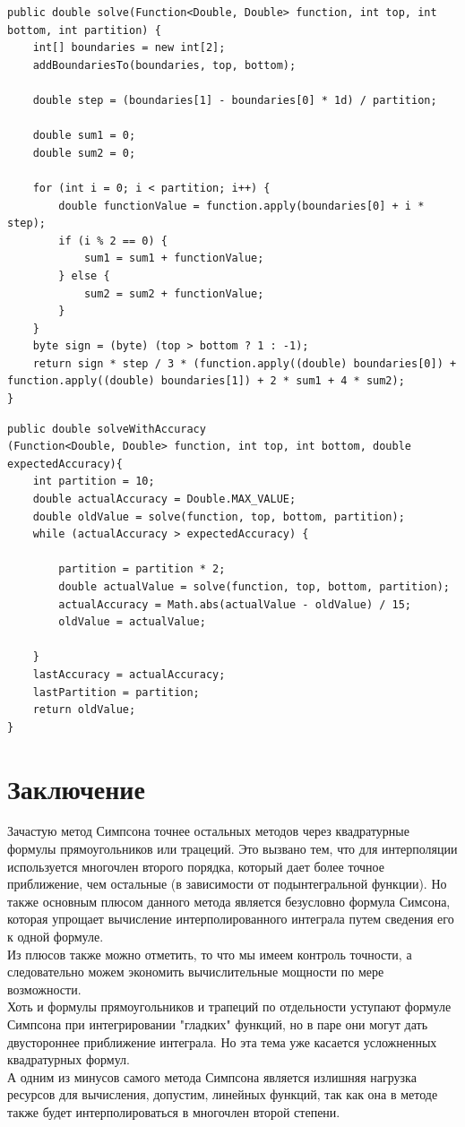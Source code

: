 \documentclass[11pt, english]{article}
\begin{document}
\begin{lstlisting}
public double solve(Function<Double, Double> function, int top, int bottom, int partition) {
    int[] boundaries = new int[2];
    addBoundariesTo(boundaries, top, bottom);

    double step = (boundaries[1] - boundaries[0] * 1d) / partition;

    double sum1 = 0;
    double sum2 = 0;

    for (int i = 0; i < partition; i++) {
        double functionValue = function.apply(boundaries[0] + i * step);
        if (i % 2 == 0) {
            sum1 = sum1 + functionValue;
        } else {
            sum2 = sum2 + functionValue;
        }
    }
    byte sign = (byte) (top > bottom ? 1 : -1);
    return sign * step / 3 * (function.apply((double) boundaries[0]) + function.apply((double) boundaries[1]) + 2 * sum1 + 4 * sum2);
}
\end{lstlisting}
\begin{lstlisting}
public double solveWithAccuracy
(Function<Double, Double> function, int top, int bottom, double expectedAccuracy){
    int partition = 10;
    double actualAccuracy = Double.MAX_VALUE;
    double oldValue = solve(function, top, bottom, partition);
    while (actualAccuracy > expectedAccuracy) {

        partition = partition * 2;
        double actualValue = solve(function, top, bottom, partition);
        actualAccuracy = Math.abs(actualValue - oldValue) / 15;
        oldValue = actualValue;

    }
    lastAccuracy = actualAccuracy;
    lastPartition = partition;
    return oldValue;
}
\end{lstlisting}

\newpage

\section{Заключение}

Зачастую метод Симпсона точнее остальных методов через квадратурные формулы прямоугольников или трацеций. Это вызвано тем, что для интерполяции используется многочлен второго порядка, который дает более точное приближение, чем остальные (в зависимости от подынтегральной функции). Но также основным плюсом данного метода является безусловно формула Симсона, которая упрощает вычисление интерполированного интеграла путем сведения его к одной формуле. \\

Из плюсов также можно отметить, то что мы имеем контроль точности, а следовательно можем экономить вычислительные мощности по мере возможности. \\

Хоть и формулы прямоугольников и трапеций по отдельности уступают формуле Симпсона при интегрировании "гладких" функций, но в паре они могут дать двустороннее приближение интеграла. Но эта тема уже касается усложненных квадратурных формул. \\

А одним из минусов самого метода Симпсона является излишняя нагрузка ресурсов для вычисления, допустим, линейных функций, так как она в методе также будет интерполироваться в многочлен второй степени.
\end{document}
